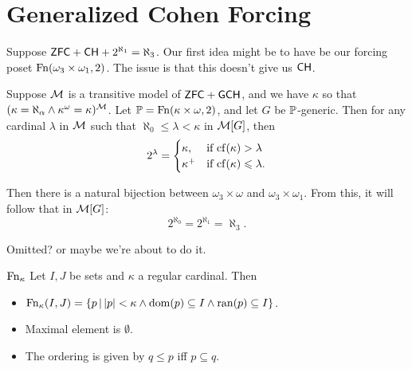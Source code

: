 \documentclass{article}
\begin{document}
    \section{Generalized Cohen Forcing}
    Suppose $\mathsf{ZFC} + \mathsf{CH} + 2^{\aleph_{1}} = \aleph_{3}$. Our first idea might be to have be our forcing poset $\operatorname{Fn}(\omega_{3} \times \omega_{1},2)$. The issue is that this doesn't give us $\mathsf{CH}$.
    \begin{fancyprop}{}
        Suppose $\mathcal{M}$ is a transitive model of $\mathsf{ZFC} + \mathsf{GCH}$, and we have $\kappa$ so that $(\kappa=\aleph_{\alpha} \wedge \kappa^{\omega}=\kappa)^{\mathcal{M}}$. Let $\mathbb{P} = \operatorname{Fn}(\kappa \times \omega, 2)$, and let $G$ be $\mathbb{P}$-generic. Then for any cardinal $\lambda$ in $\mathcal{M}$ such that $\aleph_{0} \leq \lambda < \kappa$ in $\mathcal{M}[G]$, then \[ 2^{\lambda} = \begin{cases}
                \kappa,    & \text{if $\operatorname{cf}(\kappa) > \lambda$}     \\
                \kappa^{+} & \text{if $\operatorname{cf}(\kappa) \leqslant \lambda$.}
            \end{cases}\]




        Then there is a natural bijection between $\omega_{3} \times \omega$ and $\omega_{3} \times \omega_{1}$. From this, it will follow that in $\mathcal{M}[G]$: \[ 2^{\aleph_{0}}=2^{\aleph_{1}}=\aleph_{3}.\]
    \end{fancyprop}
    \proof Omitted? or maybe we're about to do it. \endproof %
    \begin{fancydefine}{$\operatorname{Fn}_{\kappa}$}
        Let $I,J$ be sets and $\kappa$ a regular cardinal. Then \begin{itemize}
            \item $\operatorname{Fn}_{\kappa}(I,J)= \{ p \, | \, |p| < \kappa \wedge \operatorname{dom}(p) \subseteq I \wedge \operatorname{ran}(p) \subseteq I\}$.
            \item Maximal element is $\emptyset$.
            \item The ordering is given by $q \leq p$ iff $p \subseteq q$.
        \end{itemize}
    \end{fancydefine}
\end{document}
